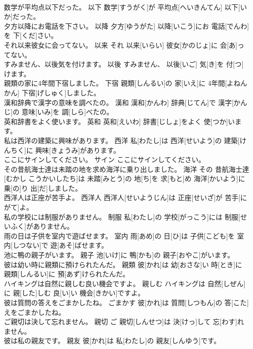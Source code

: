 \documentclass[8pt]{extreport}
\begin{document}
\begin{CJK}{UTF8}{min}
\\	数学が平均点以下だった。	以下	数学[すうがく]が 平均点[へいきんてん] 以下[いか]だった。	
\\	夕方以降にお電話を下さい。	以降	夕方[ゆうがた] 以降[いこう]にお 電話[でんわ]を 下[くだ]さい。	
\\	それ以来彼女に会ってない。	以来	それ 以来[いらい] 彼女[かのじょ]に 会[あ]ってない。	
\\	すみません、以後気を付けます。	以後	すみません、 以後[いご] 気[き]を 付[つ]けます。	
\\	親類の家に4年間下宿しました。	下宿	親類[しんるい]の 家[いえ]に 4年間[よねんかん] 下宿[げしゅく]しました。	
\\	漢和辞典で漢字の意味を調べたの。	漢和	漢和[かんわ] 辞典[じてん]で 漢字[かんじ]の 意味[いみ]を 調[しら]べたの。	
\\	英和辞書をよく使います。	英和	英和[えいわ] 辞書[じしょ]をよく 使[つか]います。	
\\	私は西洋の建築に興味があります。	西洋	私[わたし]は 西洋[せいよう]の 建築[けんちく]に 興味[きょうみ]があります。	
\\	ここにサインしてください。	サイン	ここにサインしてください。	
\\	その昔航海士達は未踏の地を求め海洋に乗り出しました。	海洋	その 昔航海士達[むかし こうかいしたち]は 未踏[みとう]の 地[ち]を 求[もと]め 海洋[かいよう]に 乗[の]り 出[だ]しました。	
\\	西洋人は正座が苦手よ。	西洋人	西洋人[せいようじん]は 正座[せいざ]が 苦手[にがて]よ。	
\\	私の学校には制服がありません。	制服	私[わたし]の 学校[がっこう]には 制服[せいふく]がありません。	
\\	雨の日は子供を室内で遊ばせます。	室内	雨[あめ]の 日[ひ]は 子供[こども]を 室内[しつない]で 遊[あそ]ばせます。	
\\	池に鴨の親子がいます。	親子	池[いけ]に 鴨[かも]の 親子[おやこ]がいます。	
\\	彼は幼い時に親類に預けられたんだ。	親類	彼[かれ]は 幼[おさな]い 時[とき]に 親類[しんるい]に 預[あず]けられたんだ。	
\\	ハイキングは自然に親しむ良い機会ですよ。	親しむ	ハイキングは 自然[しぜん]に 親[した]しむ 良[い]い 機会[きかい]ですよ。	
\\	彼は質問の答えをごまかしたね。	ごまかす	彼[かれ]は 質問[しつもん]の 答[こた]えをごまかしたね。	
\\	ご親切は決して忘れません。	親切	ご 親切[しんせつ]は 決[けっ]して 忘[わす]れません。	
\\	彼は私の親友です。	親友	彼[かれ]は 私[わたし]の 親友[しんゆう]です。	

\end{CJK}
\end{document}
